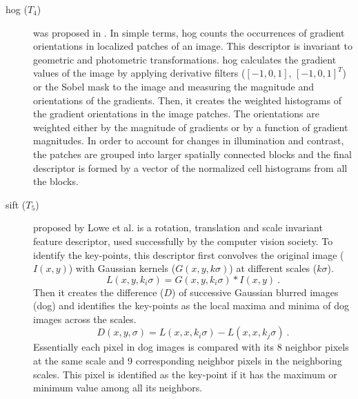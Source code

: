 \begin{description}
\item[\acf{hog} ($T_{4}$)] was proposed in \cite{dalal2005histograms}.
In simple terms, \ac{hog} counts the occurrences of gradient orientations in localized patches of an image.
This descriptor is invariant to geometric and photometric transformations.
\ac{hog} calculates the gradient values of the image by applying derivative filters ($[-1,0,1]$, $[-1,0,1]^{T}$) or the Sobel mask to the image and measuring the magnitude and orientations of the gradients.
Then, it creates the weighted histograms of the gradient orientations in the image patches.
The orientations are weighted either by the magnitude of gradients or by a function of gradient magnitudes.
In order to account for changes in illumination and contrast, the patches are grouped into larger spatially connected blocks and the final descriptor is formed by a vector of the normalized cell histograms from all the blocks.
	

\item[\acf{sift} ($T_{5}$)] proposed by Lowe et al.\cite{lowe2004distinctive} is a rotation, translation and scale invariant feature descriptor, used successfully by the computer vision society.
To identify the key-points, this descriptor first convolves the original image ($I(x,y)$) with Gaussian kernels ($G(x,y,k\sigma)$) at different scales ($k\sigma$).
\begin{equation}
L(x,y,k_{i}\sigma) = G(x,y,k_{i}\sigma)*I(x,y)~.
\label{eq:GaussianConv}
\end{equation}		
\noindent Then it creates the difference ($D$) of successive Gaussian blurred images (\acf{dog}) and identifies the key-points as the local maxima and minima of \ac{dog} images across the scales.
\begin{equation}
D(x,y,\sigma) = L(x,x, k_{i}\sigma) - L(x,x, k_{j}\sigma)~.
\label{eq:DoG}
\end{equation}
\noindent Essentially each pixel in \ac{dog} images is compared with its 8 neighbor pixels at the same scale and 9 corresponding neighbor pixels in the neighboring scales.
This pixel is identified as the key-point if it has the maximum or minimum value among all its neighbors.
		   

\end{description}
